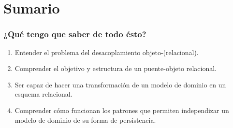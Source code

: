 \documentclass[a4paper,slidestop,xcolor=pst,blue]{beamer}
\begin{document}
\section{Sumario}

\begin{frame}[c]
    \frametitle{¿Qué tengo que saber de todo ésto?}
    \begin{enumerate}[<+->]
        \item Entender el problema del desacoplamiento objeto-(relacional).
        \item Comprender el objetivo y estructura de un puente-objeto relacional.
        \item Ser capaz de hacer una transformación de un modelo de dominio en un esquema relacional.
        \item Comprender cómo funcionan los patrones que permiten independizar un modelo de dominio de su forma de persistencia.
    \end{enumerate}
\end{frame}
\end{document}
